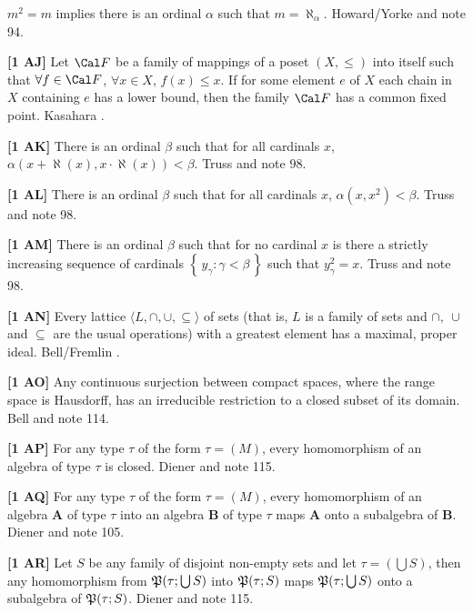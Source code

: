 $m^{2} = m$ implies there is an ordinal $\alpha$ such that $m =
\aleph _{\alpha }$.  \ac{Howard/Yorke} \cite{1989} and note 94.
\smallskip
\item{}{\bf [1 AJ]}  Let ${\Cal F}$ be a family of mappings of a  poset
$(X,\le )$ into itself such that $\forall f\in{\Cal F}$, $\forall x\in X$,
$f(x)\le x$.  If for some element $e$ of $X$ each chain in $X$ containing
$e$ has a lower bound, then the family ${\Cal F}$ has a common fixed
point.  \ac{Kasahara} \cite{1976}.
\smallskip
\item{}{\bf [1 AK]} There is an ordinal $\beta$ such that for all
cardinals $x$, $\alpha(x+\aleph(x), x\cdot\aleph(x))<\beta$. \ac{Truss}
\cite{1973b} and note 98.
\smallskip
\item{}{\bf [1 AL]} There is an ordinal $\beta$ such that for all cardinals
$x$, $\alpha(x,x^2) < \beta$.  \ac{Truss} \cite{1973b} and note 98.
\smallskip
\item{}{\bf [1 AM]} There is an ordinal $\beta$ such that for no cardinal
$x$ is there a strictly increasing sequence of cardinals $\left \{ \,
y_{\gamma} : \gamma < \beta \, \right \}$ such that $y_{\gamma}^2 = x$.
\ac{Truss} \cite{1973b} and note 98.
\smallskip
\item{}{\bf [1 AN]}  Every lattice $ \langle L,\cap,\cup, \subseteq
\rangle$ of sets (that is, $L$ is a family of sets and $\cap,\ \cup$
and $\subseteq$ are the usual operations) with a greatest element has
a maximal, proper ideal.  \ac{Bell/Fremlin} \cite{1972}.
\smallskip
\item{}{\bf [1 AO]} Any continuous surjection between compact spaces, where
the range space is Hausdorff, has an irreducible restriction to a closed
subset of its domain.  \ac{Bell} \cite{1988} and note 114.
\smallskip
\item{}{\bf [1 AP]}  For any type $\tau$ of the form $\tau = (M)$, every
homomorphism of an algebra of type $\tau$ is closed.
\ac{Diener} \cite{1989} and note 115.
\smallskip
\item{}{\bf [1 AQ]} For any type $\tau$ of the form $\tau = (M)$, every
homomorphism of an algebra {\bf A} of type $\tau$ into an algebra
{\bf B} of type $\tau$ maps {\bf A} onto a subalgebra of {\bf B}.
\ac{Diener} \cite{1989} and note 105.
\smallskip
\item{}{\bf [1 AR]}  Let $S$ be any family of disjoint non-empty sets and
let $\tau = (\bigcup S)$, then any homomorphism from $\frak P(\tau;\bigcup
S)$ into $\frak P(\tau;S)$ maps $\frak P(\tau;\bigcup S)$ onto a subalgebra
of $\frak P(\tau;S)$. \ac{Diener} \cite{1989} and note 115.
